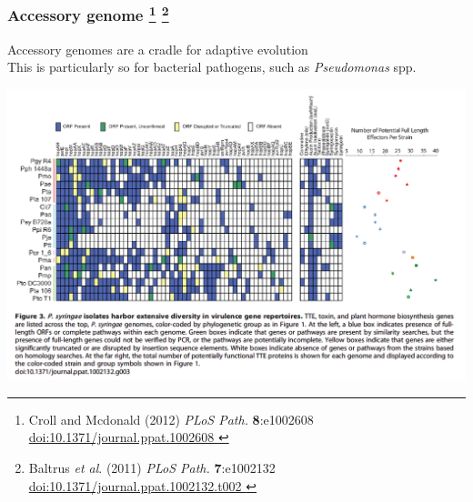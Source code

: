 \begin{frame}
  \frametitle{Accessory genome
   \footnote{\tiny{Croll and Mcdonald (2012) \textit{PLoS Path.} \textbf{8}:e1002608 \href{http://dx.doi.org/10.1371/journal.ppat.1002608}{doi:10.1371/journal.ppat.1002608
  }}}
    \footnote{\tiny{Baltrus \textit{et al}. (2011) \textit{PLoS Path.} \textbf{7}:e1002132 \href{http://dx.doi.org/10.1371/journal.ppat.1002132}{doi:10.1371/journal.ppat.1002132.t002
    }}}  
  }
  Accessory genomes are a cradle for adaptive evolution \\
  \textcolor{hutton_green}{This is particularly so for bacterial pathogens, such as \textit{Pseudomonas} spp.}
  \begin{center}
      \includegraphics[height=0.5\textheight]{images/pa_virulence} 
  \end{center}
\end{frame}

